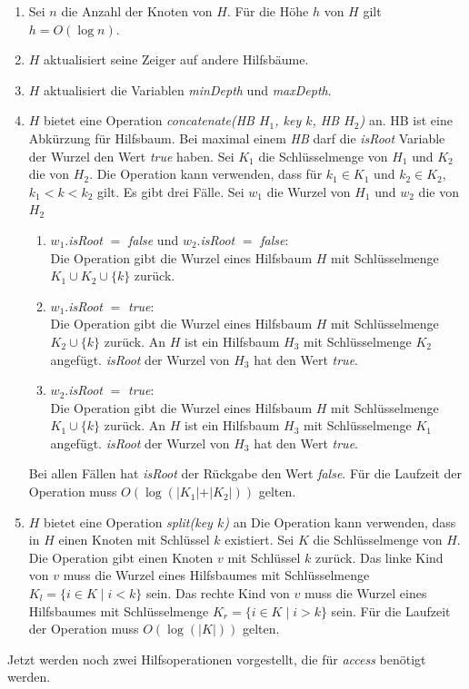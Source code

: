 \documentclass[a4paper,12pt]{article}
\begin{document}
\begin{enumerate}
	\item Sei $n$ die Anzahl der Knoten von $H$. Für die Höhe $h$ von $H$ gilt $h = O\left(\log n\right)$.
	\item $H$ aktualisiert seine Zeiger auf andere Hilfsbäume.
	\item $H$ aktualisiert die Variablen  \textit{minDepth} und \textit{maxDepth}.
	\item $H$ bietet eine Operation \textit{concatenate(HB $H_1$, key $k$, HB  $H_2$)} an. HB ist eine Abkürzung für Hilfsbaum. Bei maximal einem \textit{HB}  darf die \textit{isRoot} Variable der Wurzel den Wert \textit{true} haben. Sei $K_1$ die Schlüsselmenge von $H_1$ und $K_2$ die von $H_2$. Die Operation kann verwenden, dass für $k_1 \in K_1$ und $k_2 \in K_2$, $k_1 < k < k_2$ gilt. Es gibt drei Fälle. Sei $w_1$ die Wurzel von $H_1$ und $w_2$ die von $H_2$
	\begin{enumerate}
		\item $w_1$.\textit{isRoot} $=$ \textit{false} und $w_2$.\textit{isRoot} $=$ \textit{false}:\\
		Die Operation gibt die Wurzel eines Hilfsbaum $H$ mit Schlüsselmenge $K_1 \cup K_2 \cup \{k\} $ zurück.
		\item $w_1$.\textit{isRoot} $=$ \textit{true}:\\	
		Die Operation gibt die Wurzel eines Hilfsbaum $H$ mit Schlüsselmenge $K_2 \cup \{k\} $ zurück. An $H$ ist ein Hilfsbaum $H_3$ mit Schlüsselmenge $K_2$ angefügt. \textit{isRoot} der Wurzel von $H_3$ hat den Wert \textit{true}.
		\item $w_2$.\textit{isRoot} $=$ \textit{true}:\\	
		Die Operation gibt die Wurzel eines Hilfsbaum $H$ mit Schlüsselmenge $K_1 \cup \{k\} $ zurück. An $H$ ist ein Hilfsbaum $H_3$ mit Schlüsselmenge $K_1$ angefügt. \textit{isRoot} der Wurzel von $H_3$ hat den Wert \textit{true}.	 
	\end{enumerate}
	Bei allen Fällen hat \textit{isRoot} der Rückgabe den Wert \textit{false}.
	Für die Laufzeit der Operation muss $O\left(\log \left(\vert K_1 \vert + \vert K_2 \vert\right)\right)$ gelten.
	\item $H$ bietet eine Operation \textit{split(key $k$)} an Die Operation kann verwenden, dass in $H$ einen Knoten mit Schlüssel $k$ existiert. Sei $K$ die Schlüsselmenge von $H$. Die Operation gibt einen Knoten $v$ mit Schlüssel $k$ zurück. Das linke Kind von $v$ muss die Wurzel eines Hilfsbaumes mit Schlüsselmenge ${K_l=\{i\in K \mid  i <k\}}$ sein. Das rechte Kind von $v$ muss die Wurzel eines Hilfsbaumes mit Schlüsselmenge ${K_r=\{i\in K \mid  i > k\}}$ sein. Für die Laufzeit der Operation muss $O\left(\log \left(\vert K \vert\right) \right)$ gelten.
\end{enumerate} 
Jetzt werden noch zwei Hilfsoperationen vorgestellt, die für \textit{access} benötigt werden.\\
\end{document}
